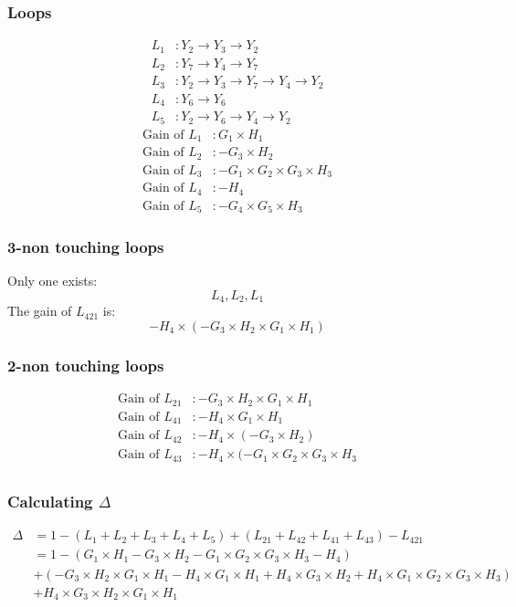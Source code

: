 \documentclass{article}
\begin{document}
\subsubsection*{Loops}
\begin{align*}
L_1 & : Y_2 \rightarrow Y_3 \rightarrow Y_2 \\
L_2 & : Y_7 \rightarrow Y_4 \rightarrow Y_7 \\
L_3 & : Y_2 \rightarrow Y_3 \rightarrow Y_7 \rightarrow Y_4 \rightarrow Y_2 \\
L_4 & : Y_6 \rightarrow Y_6 \\
L_5 & : Y_2 \rightarrow Y_6 \rightarrow Y_4 \rightarrow Y_2
\end{align*}
\begin{align*}
\text{Gain of } L_1 & : G_1 \times H_1 \\
\text{Gain of } L_2 & : -G_3 \times H_2 \\
\text{Gain of } L_3 & : -G_1 \times G_2 \times G_3 \times H_3 \\
\text{Gain of } L_4 & : -H_4 \\
\text{Gain of } L_5 & : -G_4 \times G_5 \times H_3
\end{align*}

\subsubsection*{3-non touching loops}
Only one exists: 
\[ L_4, L_2, L_1 \]
The gain of \( L_{421} \) is:
\[ -H_4 \times (-G_3 \times H_2 \times G_1 \times H_1) \]

\subsubsection*{2-non touching loops}
\begin{align*}
\text{Gain of } L_{21} & : -G_3 \times H_2 \times G_1 \times H_1 \\
\text{Gain of } L_{41} & : -H_4 \times G_1 \times H_1 \\
\text{Gain of } L_{42} & : -H_4 \times (-G_3 \times H_2) \\
\text{Gain of } L_{43} & : -H_4 \times (-G_1 \times G_2 \times G_3 \times H_3 \\
\end{align*}
\subsubsection*{Calculating \( \Delta \)}
\begin{align*}
\Delta & = 1 - (L_1 + L_2 + L_3 + L_4 + L_5) + (L_{21} + L_{42} + L_{41} + L_{43}) - L_{421} \\
& = 1 - (G_1 \times H_1 - G_3 \times H_2 - G_1 \times G_2 \times G_3 \times H_3 - H_4) \\
& + (-G_3 \times H_2 \times G_1 \times H_1 - H_4 \times G_1 \times H_1 + H_4 \times G_3 \times H_2 + H_4 \times G_1 \times G_2 \times G_3 \times H_3) \\
& + H_4 \times G_3 \times H_2 \times G_1 \times H_1
\end{align*}
\end{document}
